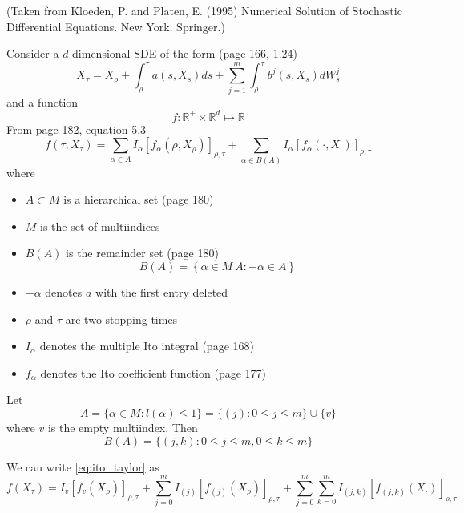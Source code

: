 \documentclass[12pt]{article}
\begin{document}
(Taken from Kloeden, P. and Platen, E. (1995) Numerical Solution of Stochastic Differential Equations. New York: Springer.)

Consider a $d$-dimensional SDE of the form (page 166, 1.24)
%
\begin{equation}
X_\tau = X_\rho + \int_\rho^\tau a(s, X_s) ds + \sum_{j=1}^m \int_\rho^\tau b^j (s, X_s) dW_s^j
\end{equation}
%
and a function 
$$f: \mathbb{R}^{+} \times \mathbb{R}^d \mapsto \mathbb{R}$$
%
From page 182, equation 5.3
%
\begin{equation} \label{eq:ito_taylor}
f(\tau, X_\tau) = \sum_{\alpha \in A} I_\alpha [f_\alpha(\rho, X_\rho)]_{\rho, \tau} + \sum_{\alpha \in B(A)} I_\alpha [f_\alpha (\cdot, X_\cdot)]_{\rho, \tau}
\end{equation}
where 
\begin{itemize}
\item $A \subset M$ is a hierarchical set (page 180)
\item $M$ is the set of multiindices 
\item  $B(A)$ is the remainder set (page 180)
$$B(A) = \left\{ \alpha \in M \ A: -\alpha \in A \right\}$$
\item  $-\alpha$ denotes $a$ with the first entry deleted
\item $\rho$ and $\tau$ are two stopping times
\item $I_\alpha$ denotes the multiple Ito integral (page 168)
\item $f_\alpha$ denotes the Ito coefficient function (page 177)
\end{itemize}


Let 
$$ A = \{ \alpha \in M : l(\alpha) \le 1 \} = \{ (j) : 0 \le j \le m \} \cup \{v \}$$
where $v$ is the empty multiindex.
%
Then
$$B(A) = \{ (j, k) : 0 \le j \le m, 0 \le k \le m \}$$

We can write \eqref{eq:ito_taylor} as
\begin{equation} \label{eq:ito_taylor2}
f( X_\tau) = I_{v} [f_{v} ( X_\rho)]_{\rho, \tau} + \sum_{j=0}^m I_{(j)} [f_{(j)}( X_\rho)]_{\rho, \tau} + \sum_{j=0}^m \sum_{k=0}^m I_{(j,k)} [f_{(j,k)} ( X_\cdot)]_{\rho, \tau}
\end{equation}
\end{document}
